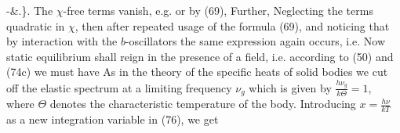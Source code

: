 \begin{paper}{1}
{-&\left.\cdot{}\right\}.
}
The $\chi$-free terms vanish, e.g.
or by (69),
Further,
Neglecting the terms quadratic in $\chi$, then after repeated usage of the formula (69), and noticing that by interaction with the $b$-oscillators the same expression again occurs, i.e. 
Now static equilibrium shall reign in the presence of a field, i.e. according to (50) and (74c) we must have
As in the theory of the specific heats of solid bodies we cut off the elastic spectrum at a limiting frequency $\nu_g$ which is given by $\frac{h\nu_g}{k\Theta}=1$, where $\Theta$ denotes the characteristic temperature of the body. Introducing $x=\frac{h\nu}{kT}$ as a new integration variable in (76), we get


\end{paper}
